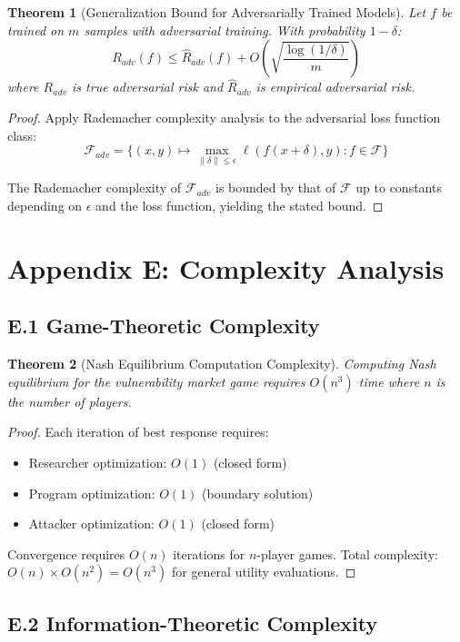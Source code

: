 \documentclass[journal]{IEEEtran}
\newtheorem{theorem}{Theorem}
\begin{document}
\begin{theorem}[Generalization Bound for Adversarially Trained Models]
Let $f$ be trained on $m$ samples with adversarial training. With probability $1-\delta$:
$$R_{adv}(f) \leq \hat{R}_{adv}(f) + O\left(\sqrt{\frac{\log(1/\delta)}{m}}\right)$$
where $R_{adv}$ is true adversarial risk and $\hat{R}_{adv}$ is empirical adversarial risk.
\end{theorem}

\begin{proof}
Apply Rademacher complexity analysis to the adversarial loss function class:
$$\mathcal{F}_{adv} = \{(x,y) \mapsto \max_{\|\delta\| \leq \epsilon} \ell(f(x+\delta), y) : f \in \mathcal{F}\}$$

The Rademacher complexity of $\mathcal{F}_{adv}$ is bounded by that of $\mathcal{F}$ up to constants depending on $\epsilon$ and the loss function, yielding the stated bound.
\end{proof}

\section{Appendix E: Complexity Analysis}

\subsection{E.1 Game-Theoretic Complexity}

\begin{theorem}[Nash Equilibrium Computation Complexity]
Computing Nash equilibrium for the vulnerability market game requires $O(n^3)$ time where $n$ is the number of players.
\end{theorem}

\begin{proof}
Each iteration of best response requires:
\begin{itemize}
\item Researcher optimization: $O(1)$ (closed form)
\item Program optimization: $O(1)$ (boundary solution)
\item Attacker optimization: $O(1)$ (closed form)
\end{itemize}

Convergence requires $O(n)$ iterations for $n$-player games.
Total complexity: $O(n) \times O(n^2) = O(n^3)$ for general utility evaluations.
\end{proof}

\subsection{E.2 Information-Theoretic Complexity}
\end{document}
